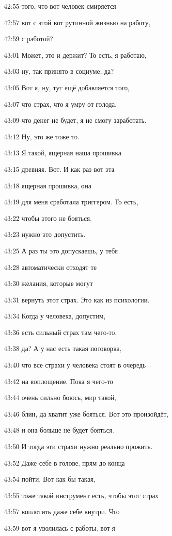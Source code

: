 42:55
того, что вот человек смиряется

42:57
вот с этой вот рутинной жизнью на работу,

42:59
с работой?

43:01
Может, это и держит? То есть, я работаю,

43:03
ну, так принято в социуме, да?

43:05
Вот я, ну, тут ещё добавляется того,

43:07
что страх, что я умру от голода,

43:09
что денег не будет, я не смогу заработать.

43:12
Ну, это же тоже то.

43:13
Я такой, ящерная наша прошивка

43:15
древняя. Вот. И как раз вот эта

43:18
ящерная прошивка, она

43:19
для меня сработала триггером. То есть,

43:22
чтобы этого не бояться,

43:23
нужно это допустить.

43:25
А раз ты это допускаешь, у тебя

43:28
автоматически отходят те

43:30
желания, которые могут

43:31
вернуть этот страх. Это как из психологии.

43:34
Когда у человека, допустим,

43:36
есть сильный страх там чего-то,

43:38
да? А у нас есть такая поговорка,

43:40
что все страхи у человека стоят в очередь

43:42
на воплощение. Пока я чего-то

43:44
очень сильно боюсь, мир такой,

43:46
блин, да хватит уже бояться. Вот это произойдёт,

43:48
и она больше не будет бояться.

43:50
И тогда эти страхи нужно реально прожить.

43:52
Даже себе в голове, прям до конца

43:54
пойти. Вот как бы такая,

43:55
тоже такой инструмент есть, чтобы этот страх

43:57
воплотить даже себе внутри. Что

43:59
вот я уволилась с работы, вот я

